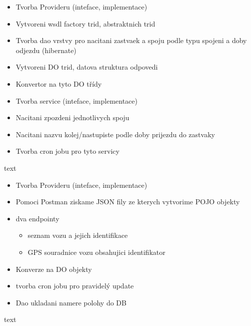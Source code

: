\begin{itemize}
	\item Tvorba Provideru (inteface, implementace)
	\item Vytvoreni wsdl factory trid, abstraktnich trid
	\item Tvorba dao vrstvy pro nacitani zastvaek a spoju podle typu spojeni a doby odjezdu (hibernate)
	\item Vytvoreni DO trid, datova struktura odpovedi  
	\item Konvertor na tyto DO třídy
	\item Tvorba service (inteface, implementace)
	\item Nacitani zpozdeni jednotlivych spoju
	\item Nacitani nazvu kolej/nastupiste podle doby prijezdu do zastvaky
	\item Tvorba cron jobu pro tyto servicy
\end{itemize}

text

\begin{itemize}
	\item Tvorba Provideru (inteface, implementace)
	\item Pomoci Postman ziskame JSON fily ze kterych vytvorime POJO objekty
	\item dva endpointy
	\begin{itemize}
		\item seznam vozu a jejich identifikace
		\item GPS souradnice vozu obsahujici identifikator
	\end{itemize}
	\item Konverze na DO objekty
	\item tvorba cron jobu pro pravidelý update
	\item Dao ukladani namere polohy do DB
\end{itemize}

text

